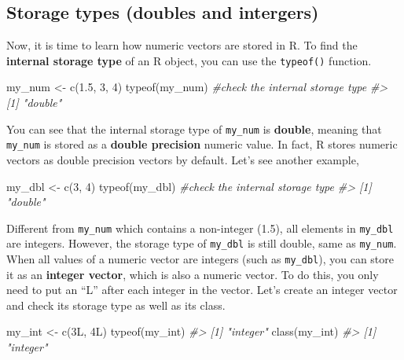 \documentclass[
]{book}
\newenvironment{Shaded}{\begin{snugshade}}{\end{snugshade}}
\newcommand{\CommentTok}[1]{\textcolor[rgb]{0.56,0.35,0.01}{\textit{#1}}}
\newcommand{\DecValTok}[1]{\textcolor[rgb]{0.00,0.00,0.81}{#1}}
\newcommand{\FloatTok}[1]{\textcolor[rgb]{0.00,0.00,0.81}{#1}}
\newcommand{\FunctionTok}[1]{\textcolor[rgb]{0.00,0.00,0.00}{#1}}
\newcommand{\NormalTok}[1]{#1}
\newcommand{\OtherTok}[1]{\textcolor[rgb]{0.56,0.35,0.01}{#1}}
\begin{document}
\hypertarget{storage-type}{%
\subsection{Storage types (doubles and intergers)}\label{storage-type}}

Now, it is time to learn how numeric vectors are stored in R. To find the \textbf{internal storage type} of an R object, you can use the \texttt{typeof()} function.

\begin{Shaded}
\begin{Highlighting}[]
\NormalTok{my\_num }\OtherTok{\textless{}{-}} \FunctionTok{c}\NormalTok{(}\FloatTok{1.5}\NormalTok{, }\DecValTok{3}\NormalTok{, }\DecValTok{4}\NormalTok{)}
\FunctionTok{typeof}\NormalTok{(my\_num)         }\CommentTok{\#check the internal storage type}
\CommentTok{\#\textgreater{} [1] "double"}
\end{Highlighting}
\end{Shaded}

You can see that the internal storage type of \texttt{my\_num} is \textbf{double}, meaning that \texttt{my\_num} is stored as a \textbf{double precision} numeric value. In fact, R stores numeric vectors as double precision vectors by default. Let's see another example,

\begin{Shaded}
\begin{Highlighting}[]
\NormalTok{my\_dbl }\OtherTok{\textless{}{-}} \FunctionTok{c}\NormalTok{(}\DecValTok{3}\NormalTok{, }\DecValTok{4}\NormalTok{)}
\FunctionTok{typeof}\NormalTok{(my\_dbl)         }\CommentTok{\#check the internal storage type}
\CommentTok{\#\textgreater{} [1] "double"}
\end{Highlighting}
\end{Shaded}

Different from \texttt{my\_num} which contains a non-integer (1.5), all elements in \texttt{my\_dbl} are integers. However, the storage type of \texttt{my\_dbl} is still double, same as \texttt{my\_num}. When all values of a numeric vector are integers (such as \texttt{my\_dbl}), you can store it as an \textbf{integer vector}, which is also a numeric vector. To do this, you only need to put an ``L'' after each integer in the vector. Let's create an integer vector and check its storage type as well as its class.

\begin{Shaded}
\begin{Highlighting}[]
\NormalTok{my\_int }\OtherTok{\textless{}{-}} \FunctionTok{c}\NormalTok{(3L, 4L)}
\FunctionTok{typeof}\NormalTok{(my\_int)}
\CommentTok{\#\textgreater{} [1] "integer"}
\FunctionTok{class}\NormalTok{(my\_int)}
\CommentTok{\#\textgreater{} [1] "integer"}
\end{Highlighting}
\end{Shaded}
\end{document}
